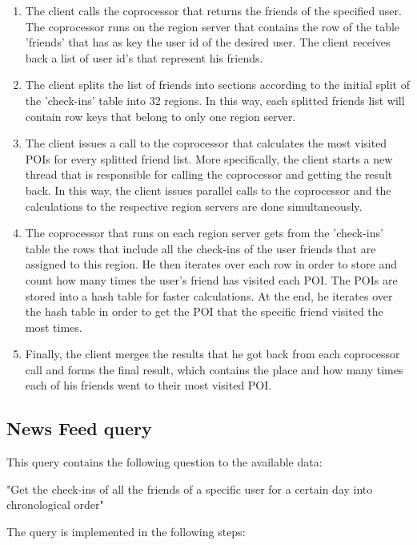 \begin{enumerate}
 \item The client calls the coprocessor that returns the friends of the specified user. The coprocessor runs on the region server that contains 
 the row of the table 'friends' that has as key the user id of the desired user. The client receives back a list of user id's that 
 represent his friends.
 \item The client splits the list of friends into sections according to the initial split of the 'check-ins' table into 32 regions. In this way, 
 each splitted friends list will contain row keys that belong to only one region server.
 \item The client issues a call to the coprocessor that calculates the most visited POIs for every splitted friend list. 
 More specifically, the client starts a new thread that is responsible for calling the coprocessor and getting the result back. 
 In this way, the client issues parallel calls to the coprocessor and the calculations to the respective region servers are done simultaneously.
 \item The coprocessor that runs on each region server gets from the 'check-ins' table the rows that include all the check-ins of the user friends 
 that are assigned to this region. He then iterates over each row in order to store and count how many times the user's friend has visited each POI. 
 The POIs are stored into a hash table for faster calculations. At the end, he iterates over the hash table in order to get the POI that the 
 specific friend visited the most times.
 \item Finally, the client merges the results that he got back from each coprocessor call and forms the final result, which contains the place and how many times 
 each of his friends went to their most visited POI.
\end{enumerate}

\subsection{News Feed query}

This query contains the following question to the available data:
\begin{center}
 "Get the check-ins of all the friends of a specific user for a certain day into chronological order"
\end{center}

The query is implemented in the following steps:

